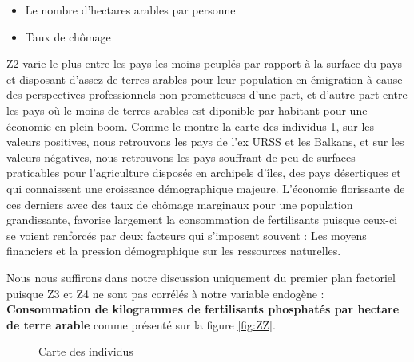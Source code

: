\begin{enumerate}
\begin{itemize}
\begin{itemize}
		\item Le nombre d'hectares arables par personne
		\item Taux de chômage
		\end{itemize}
		Z2 varie le plus entre les pays les moins peuplés par rapport à la surface du pays et disposant d'assez de terres arables pour leur population en émigration à cause des perspectives professionnels non prometteuses d'une part, et d'autre part entre les pays où le moins de terres arables est diponible par habitant pour une économie en plein boom. Comme le montre la carte des individus \ref{fig:inter3}, sur les valeurs positives, nous retrouvons les pays de l'ex URSS et les Balkans, et sur les valeurs négatives, nous retrouvons les pays souffrant de peu de surfaces praticables pour l'agriculture disposés en archipels d’îles, des pays désertiques et qui connaissent une croissance démographique majeure. L'économie florissante de ces derniers avec des taux de chômage marginaux pour une population grandissante, favorise largement la consommation de fertilisants puisque ceux-ci se voient renforcés par deux facteurs qui s'imposent souvent : Les moyens financiers et la pression démographique sur les ressources naturelles.
		\end{itemize}
		Nous nous suffirons dans notre discussion uniquement du premier plan factoriel puisque Z3 et Z4 ne sont pas corrélés à notre variable endogène : \textbf{Consommation de kilogrammes de fertilisants phosphatés par hectare de terre arable} comme présenté sur la figure \ref{fig:ZZ}.
	\end{enumerate}
					\begin{figure}[H]
					\centering
					\caption{Carte des individus}
					\label{fig:inter3}
					\end{figure}
			
